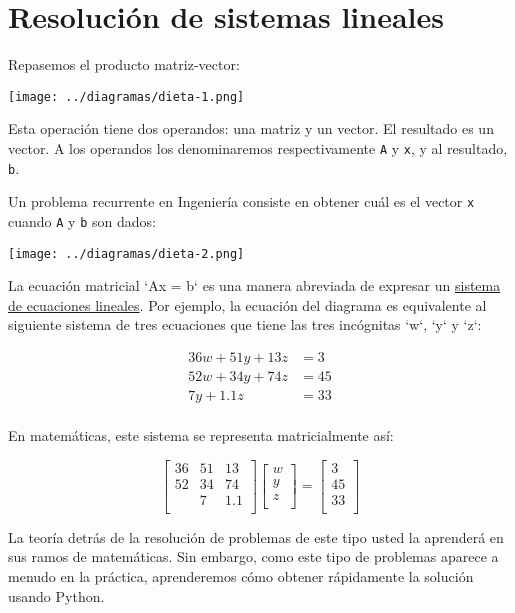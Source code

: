 \section{Resolución de sistemas lineales}

Repasemos el producto matriz-vector:

\texttt{[image: ../diagramas/dieta-1.png]}

Esta operación tiene dos operandos: una matriz y un vector. El resultado
es un vector. A los operandos los denominaremos respectivamente
\lstinline!A! y \lstinline!x!, y al resultado, \lstinline!b!.

Un problema recurrente en Ingeniería consiste en obtener cuál es el
vector \lstinline!x! cuando \lstinline!A! y \lstinline!b! son dados:

\texttt{[image: ../diagramas/dieta-2.png]}

La ecuación matricial `Ax = b` es una manera abreviada de expresar un
\href{http://es.wikipedia.org/wiki/Sistema\_de\_ecuaciones\_lineales}{sistema
de ecuaciones lineales}. Por ejemplo, la ecuación del diagrama es
equivalente al siguiente sistema de tres ecuaciones que tiene las tres
incógnitas `w`, `y` y `z`:

\[\begin{align}
36w + 51y + 13z &= 3 \\
52w + 34y + 74z &= 45 \\
7y + 1.1z &= 33 \\
\end{align}\]

En matemáticas, este sistema se representa matricialmente así:

\[\begin{bmatrix}
36 & 51 & 13 \\
52 & 34 & 74 \\
&  7 & 1.1 \\
\end{bmatrix}
\begin{bmatrix}
w \\ y \\ z \\
\end{bmatrix}
=
\begin{bmatrix}
3 \\ 45 \\ 33 \\
\end{bmatrix}\]

La teoría detrás de la resolución de problemas de este tipo usted la
aprenderá en sus ramos de matemáticas. Sin embargo, como este tipo de
problemas aparece a menudo en la práctica, aprenderemos cómo obtener
rápidamente la solución usando Python.

